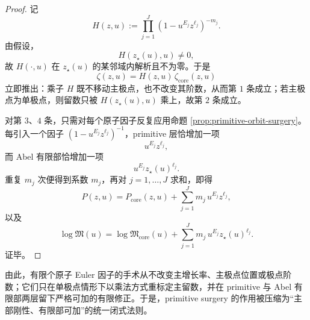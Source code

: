 \begin{proof}
记
\[
H(z,u):=\prod_{j=1}^{J}(1-u^{E_j}z^{\ell_j})^{-m_j}.
\]
由假设，
\[
H(z_\star(u),u)\neq 0,
\]
故 \(H(\cdot,u)\) 在 \(z_\star(u)\) 的某邻域内解析且不为零。于是
\[
\zeta(z,u)=H(z,u)\,\zeta_{\mathrm{core}}(z,u)
\]
立即推出：乘子 \(H\) 既不移动主极点，也不改变其阶数，从而第 \(1\) 条成立；若主极点为单极点，则留数只被 \(H(z_\star(u),u)\) 乘上，故第 \(2\) 条成立。

对第 \(3\)、\(4\) 条，只需对每个原子因子反复应用命题 \ref{prop:primitive-orbit-surgery}。每引入一个因子 \((1-u^{E_j}z^{\ell_j})^{-1}\)，primitive 层恰增加一项
\[
u^{E_j}z^{\ell_j},
\]
而 Abel 有限部恰增加一项
\[
u^{E_j}z_\star(u)^{\ell_j}.
\]
重复 \(m_j\) 次便得到系数 \(m_j\)，再对 \(j=1,\dots,J\) 求和，即得
\[
P(z,u)=P_{\mathrm{core}}(z,u)+\sum_{j=1}^{J}m_j\,u^{E_j}z^{\ell_j},
\]
以及
\[
\log\mathfrak M(u)
=
\log\mathfrak M_{\mathrm{core}}(u)
+
\sum_{j=1}^{J}m_j\,u^{E_j}z_\star(u)^{\ell_j}.
\]
证毕。
\end{proof}

\noindent
由此，有限个原子 Euler 因子的手术从不改变主增长率、主极点位置或极点阶数；它们只在单极点情形下以乘法方式重标定主留数，并在 primitive 与 Abel 有限部两层留下严格可加的有限修正。于是，primitive surgery 的作用被压缩为“主部刚性、有限部可加”的统一闭式法则。

